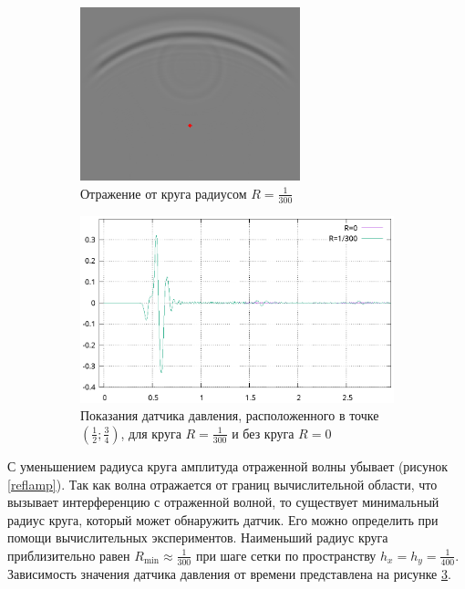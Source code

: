 \documentclass[a4paper, fontsize=14pt]{article}
\begin{document}
\begin{figure}
	\begin{subfigure}{\textwidth}
	\centering
	\includegraphics[width=0.7\textwidth]{detector.eps}
	\caption{Отражение от круга радиусом $R=\frac{1}{300}$}
	\label{detector}
	\end{subfigure}
	\begin{subfigure}{\textwidth}
	\centering
	\includegraphics[width=1\textwidth]{sensor.eps}
	\caption{Показания датчика давления, расположенного в точке
	$\left(\frac{1}{2};\frac{3}{4}\right)$, для круга $R = \frac{1}{300}$ и без круга $R=0$}
	\label{sensor}
	\end{subfigure}
    \caption{}
\end{figure}

С уменьшением радиуса круга амплитуда отраженной волны убывает (рисунок \ref{reflamp}). Так как
волна отражается от границ вычислительной области, что вызывает интерференцию с отраженной волной, 
то существует минимальный радиус круга, который может обнаружить датчик.
Его можно определить при помощи вычислительных экспериментов. Наименьший радиус круга
приблизительно равен $R_\text{min} \approx \frac{1}{300}$ при шаге сетки по пространству $h_x = h_y
= \frac{1}{400}$. Зависимость значения датчика давления от времени представлена на рисунке
\ref{sensor}.
\end{document}
